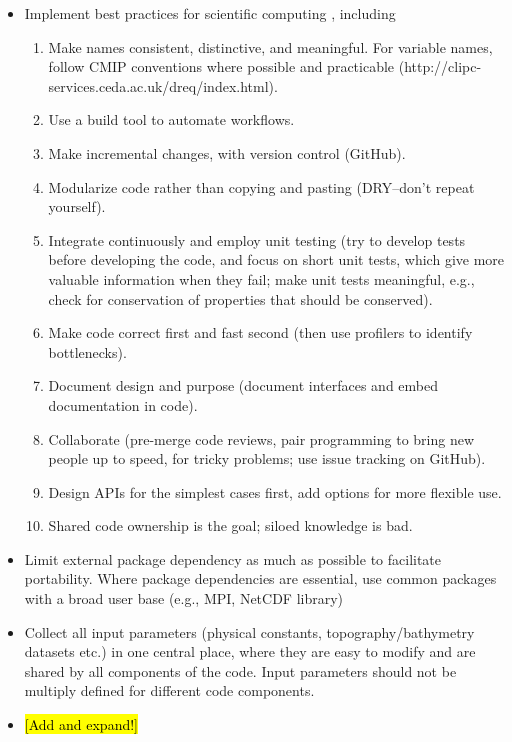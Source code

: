 \documentclass{article}
\begin{document}
\begin{itemize}
    \item Implement best practices for scientific computing \citep[e.g.,][]{Wilson14a}, including
        \begin{enumerate}
            \item Make names consistent, distinctive, and meaningful. For variable names, follow CMIP conventions where possible and practicable (http://clipc-services.ceda.ac.uk/dreq/index.html).
            \item Use a build tool to automate workflows.
            \item Make incremental changes, with version control (GitHub).
            \item Modularize code rather than copying and pasting (DRY--don't repeat yourself).
            \item Integrate continuously and employ unit testing (try to develop tests before developing the code, and focus on short unit tests, which give more valuable information when they fail; make unit tests meaningful, e.g., check for conservation of properties that should be conserved).
            \item Make code correct first and fast second (then use profilers to identify bottlenecks).
            \item Document design and purpose (document interfaces and embed documentation in code).
            \item Collaborate (pre-merge code reviews, pair programming to bring new people up to speed, for tricky problems; use issue tracking on GitHub).
            \item Design APIs for the simplest cases first, add options for more flexible use.
            \item Shared code ownership is the goal; siloed knowledge is bad.
        \end{enumerate}
    \item Limit external package dependency as much as possible to facilitate portability. Where package dependencies are essential, use common packages with a broad user base (e.g., MPI, NetCDF library)
    \item Collect all input parameters (physical constants, topography/bathymetry datasets etc.) in one central place, where they are easy to modify and are shared by all components of the code. Input parameters should not be multiply defined for different code components.
    \item \hl{[Add and expand!]}
\end{itemize}
\end{document}
